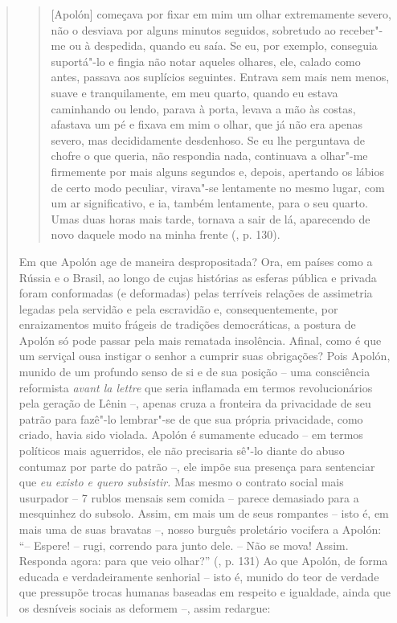 {\begin{quote}
\begin{quote}
{[}Apolón{]} começava por fixar em mim um olhar extremamente severo, não
o desviava por alguns minutos seguidos, sobretudo ao receber"-me ou à
despedida, quando eu saía. Se eu, por exemplo, conseguia suportá"-lo e
fingia não notar aqueles olhares, ele, calado como antes, passava aos
suplícios seguintes. Entrava sem mais nem menos, suave e tranquilamente,
em meu quarto, quando eu estava caminhando ou lendo, parava à porta,
levava a mão às costas, afastava um pé e fixava em mim o olhar, que já
não era apenas severo, mas decididamente desdenhoso. Se eu lhe
perguntava de chofre o que queria, não respondia nada, continuava a
olhar"-me firmemente por mais alguns segundos e, depois, apertando os
lábios de certo modo peculiar, virava"-se lentamente no mesmo lugar, com
um ar significativo, e ia, também lentamente, para o seu quarto. Umas
duas horas mais tarde, tornava a sair de lá, aparecendo de novo daquele
modo na minha frente (, p. 130).
\end{quote}

Em que Apolón age de maneira despropositada? Ora, em países como a
Rússia e o Brasil, ao longo de cujas histórias as esferas pública e
privada foram conformadas (e deformadas) pelas terríveis relações de
assimetria legadas pela servidão e pela escravidão e, consequentemente,
por enraizamentos muito frágeis de tradições democráticas, a postura de
Apolón só pode passar pela mais rematada insolência. Afinal, como é que
um serviçal ousa instigar o senhor a cumprir suas obrigações? Pois
Apolón, munido de um profundo senso de si e de sua posição -- uma
consciência reformista \emph{avant la lettre} que seria inflamada em
termos revolucionários pela geração de Lênin --, apenas cruza a
fronteira da privacidade de seu patrão para fazê"-lo lembrar"-se de que
sua própria privacidade, como criado, havia sido violada. Apolón é
sumamente educado -- em termos políticos mais aguerridos, ele não
precisaria sê"-lo diante do abuso contumaz por parte do patrão --, ele
impõe sua presença para sentenciar que \emph{eu existo e quero
subsistir.} Mas mesmo o contrato social mais usurpador -- 7 rublos
mensais sem comida -- parece demasiado para a mesquinhez do subsolo.
Assim, em mais um de seus rompantes -- isto é, em mais uma de suas
bravatas --, nosso burguês proletário vocifera a Apolón: ``-- Espere! --
rugi, correndo para junto dele. -- Não se mova! Assim. Responda agora:
para que veio olhar?'' (, p. 131) Ao que Apolón, de forma educada e
verdadeiramente senhorial -- isto é, munido do teor de verdade que
pressupõe trocas humanas baseadas em respeito e igualdade, ainda que os
desníveis sociais as deformem --, assim redargue:


\end{quote}}
